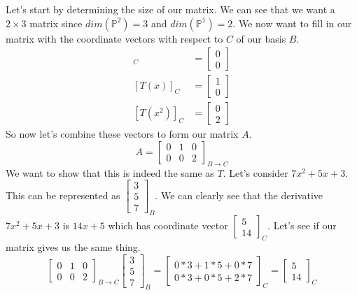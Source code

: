 \begin{example}
    Let's start by determining the size of our matrix. We can see that we want a $2\times 3$ matrix since $dim(\mathbb{P}^2)=3$ and $dim(\mathbb{P}^1)=2$. We now want to fill in our matrix with the coordinate vectors with respect to $C$ of our basis $B$.
    \begin{align*}
        [T(1)]_C&=\begin{bmatrix}
            0 \\ 0
        \end{bmatrix}\\
        [T(x)]_C&=\begin{bmatrix}
            1 \\ 0
        \end{bmatrix}\\
        [T(x^2)]_C&=\begin{bmatrix}
            0 \\ 2
        \end{bmatrix}
    \end{align*}
    So now let's combine these vectors to form our matrix $A$.
    $$A=\begin{bmatrix}
        0 & 1 & 0\\
        0 & 0 & 2
    \end{bmatrix}_{B\to C}$$
    We want to show that this is indeed the same as $T$. Let's consider $7x^2+5x+3$. This can be represented as $\begin{bmatrix}
        3 \\ 5 \\ 7
    \end{bmatrix}_B$. We can clearly see that the derivative $7x^2+5x+3$ is $14x+5$ which has coordinate vector $\begin{bmatrix}
        5 \\ 14
    \end{bmatrix}_C$. Let's see if our matrix gives us the same thing.
    $$\begin{bmatrix}
        0 & 1 & 0\\
        0 & 0 & 2
    \end{bmatrix}_{B\to C}\begin{bmatrix}
        3 \\ 5 \\ 7
    \end{bmatrix}_B=\begin{bmatrix}
        0*3+1*5+0*7\\
        0*3+0*5+2*7
    \end{bmatrix}_C=\begin{bmatrix}
        5 \\ 14
    \end{bmatrix}_C$$
\end{example}
